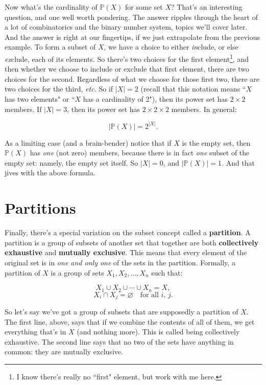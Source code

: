 Now what's the cardinality of $\mathbb{P}(X)$ for some
set $X$? That's an interesting question, and one well worth pondering. The
answer ripples through the heart of a lot of combinatorics
 and the binary number system, 
topics we'll cover later. And the answer is right at our fingertips, if we
just extrapolate from the previous example. To form a subset of $X$, we
have a choice to either \textit{in}clude, or else \textit{ex}clude, each of
its elements. So there's two choices for the first element\footnote{I know
there's really no ``first" element, but work with me here.}, and then
whether we choose to include or exclude that first element, there are two
choices for the second. Regardless of what we choose for those first two,
there are two choices for the third, \textit{etc.} So if $|X|=2$ (recall
that this notation means ``$X$ has two elements" or ``$X$ has a cardinality
of 2"), then its power set has $2 \times 2$ members. If $|X|=3$, then its
power set has $2 \times 2 \times 2$ members.  In general:

\[
|\mathbb{P}(X)| = 2^{|X|}.
\]

As a limiting case (and a brain-bender) notice that if $X$ is the empty
set,  then $\mathbb{P}(X)$ has \textit{one} (not zero)
members, because there is in fact \textit{one} subset of the empty set:
namely, the empty set itself. So $|X|=0$, and $|\mathbb{P}(X)|=1$. And that
jives with the above formula.


\section{Partitions}
\label{partitions}


Finally, there's a special variation on the subset concept called a
\textbf{partition}. A partition is a group of subsets of another set that
together are both \textbf{collectively exhaustive} and \textbf{mutually
exclusive}. This means that every element of the original set is in
\textit{one and only one} of the sets in the partition. Formally, a
partition of $X$ is a group of sets $X_1, X_2, \dots, X_n$ such that:

\[
X_1 \cup X_2 \cup \cdots \cup X_n = X,
\]
\[
X_i \cap X_j = \varnothing \quad \text{for all $i$, $j$}.
\]

So let's say we've got a group of subsets that are supposedly a partition
of $X$. The first line, above, says that if we combine the contents of all
of them, we get everything that's in $X$ (and nothing more). This is called
being collectively exhaustive. The second line says that no two of the sets
have anything in common: they are mutually exclusive.


